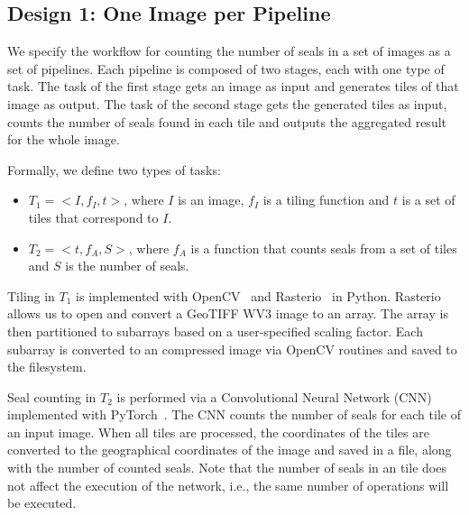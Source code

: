 \subsection{Design 1: One Image per Pipeline}
\label{ssec:approach1}\label{des1}



We specify the workflow for counting the number of seals in a set of images as 
a set of pipelines. Each pipeline is composed of two stages, each with one 
type of task. The task of the first stage gets an image as input and generates 
tiles of that image as output. The task of the second stage gets the generated 
tiles as input, counts the number of seals found in each tile and outputs the 
aggregated result for the whole image.

Formally, we define two types of tasks:
\begin{itemize}
    \item $T_{1} = <I, f_{I}, t>$, where $I$ is an image, $f_{I}$ is a tiling 
    function and $t$ is a set of tiles that correspond to $I$.
    \item $T_{2} = <t, f_{A}, S>$, where $f_{A}$ is a function that counts 
    seals from a set of tiles and $S$ is the number of seals.
\end{itemize}


Tiling in $T_{1}$ is implemented with OpenCV~\cite{bradski2000opencv} and 
Rasterio~\cite{gillies2013rasterio} in Python. Rasterio allows us to open and 
convert a GeoTIFF WV3 image to an array. The array is then partitioned to 
sub\-arrays based on a user-specified scaling factor. Each sub\-array is 
converted to an compressed image via OpenCV routines and saved to the 
filesystem.

Seal counting in $T_{2}$ is performed via a Convolutional Neural Network (CNN) 
implemented with PyTorch~\cite{paszke2017automatic}. The CNN counts the number 
of seals for each tile of an input image. When all tiles are processed, the 
coordinates of the tiles are converted to the geographical coordinates of the 
image and saved in a file, along with the number of counted seals. Note that 
the number of seals in an tile does not affect the execution of the network, 
i.e., the same number of operations will be executed.

